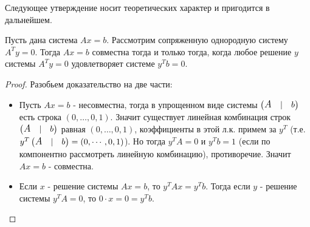 Следующее утверждение носит теоретических характер и пригодится в дальнейшем.
\begin{theorem}[Фредгольма]
\label{Теорема Фредгольма.}
    Пусть дана система $Ax=b$. Рассмотрим сопряженную однородную систему $A^Ty=0$. Тогда $Ax=b$ совместна тогда и только тогда, когда любое решение $y$ системы $A^Ty=0$ удовлетворяет системе $y^Tb=0$.
\end{theorem}
\begin{proof}
    Разобьем доказательство на две части:
    \begin{itemize}
        \item[$\Leftarrow$] Пусть $Ax=b$ - несовместна, тогда в упрощенном виде системы $ \left( \begin{matrix} \text{\large \textit{A}} & |& b \end{matrix} \right) $ есть строка $(0, \dots, 0, 1)$. Значит существует линейная комбинация строк $ \left( \begin{matrix} \text{\large \textit{A}} & |& b \end{matrix} \right) $ равная $(0, \dots, 0, 1)$, коэффициенты в этой л.к. примем за $y^T$ (т.е. $y^T \left( \begin{matrix} \text{\large \textit{A}} & |& b \end{matrix} \right)=(0, \cdots, 0, 1)$). Но тогда $y^TA=0$ и $y^Tb=1$ (если по компонентно рассмотреть линейную комбинацию), противоречие. Значит $Ax=b$ - совместна.
        \item[$\Rightarrow$] Если $x$ - решение системы $Ax=b$, то $y^TAx=y^Tb$. Тогда если $y$ - решение системы $y^TA=0$, то $0 \cdot x = 0 = y^Tb$.
    \end{itemize}
\end{proof}
